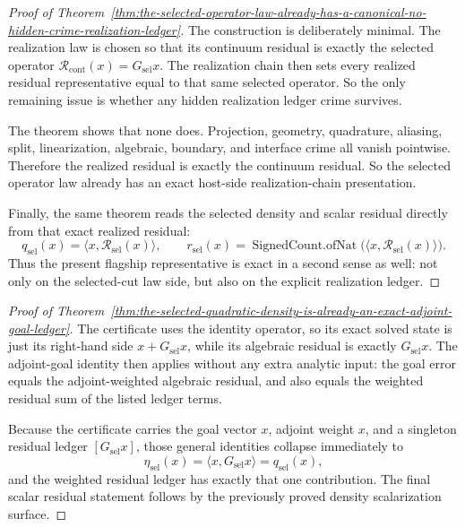 \begin{proof}[Proof of Theorem~\ref{thm:the-selected-operator-law-already-has-a-canonical-no-hidden-crime-realization-ledger}]
\label{proof:thm:the-selected-operator-law-already-has-a-canonical-no-hidden-crime-realization-ledger}
The construction is deliberately minimal. The realization law is chosen so
that its continuum residual is exactly the selected operator
\(\mathcal R_{\mathrm{cont}}(x)=G_{\mathrm{sel}}x\). The realization chain
then sets every realized residual representative equal to that same selected
operator. So the only remaining issue is whether any hidden realization ledger
crime survives.

The theorem shows that none does. Projection, geometry, quadrature, aliasing,
split, linearization, algebraic, boundary, and interface crime all vanish
pointwise. Therefore the realized residual is exactly the continuum residual.
So the selected operator law already has an exact host-side
realization-chain presentation.

Finally, the same theorem reads the selected density and scalar residual
directly from that exact realized residual:
\[
q_{\mathrm{sel}}(x)=\langle x,\mathcal R_{\mathrm{sel}}(x)\rangle,
\qquad
r_{\mathrm{sel}}(x)=\operatorname{SignedCount.ofNat}\!\bigl(\langle x,\mathcal R_{\mathrm{sel}}(x)\rangle\bigr).
\]
Thus the present flagship representative is exact in a second sense as well:
not only on the selected-cut law side, but also on the explicit realization
ledger.
\end{proof}

\begin{proof}[Proof of Theorem~\ref{thm:the-selected-quadratic-density-is-already-an-exact-adjoint-goal-ledger}]
\label{proof:thm:the-selected-quadratic-density-is-already-an-exact-adjoint-goal-ledger}
The certificate uses the identity operator, so its exact solved state is just
its right-hand side \(x+G_{\mathrm{sel}}x\), while its algebraic residual is
exactly \(G_{\mathrm{sel}}x\). The adjoint-goal identity then applies without
any extra analytic input: the goal error equals the adjoint-weighted algebraic
residual, and also equals the weighted residual sum of the listed ledger
terms.

Because the certificate carries the goal vector \(x\), adjoint weight \(x\),
and a singleton residual ledger \([G_{\mathrm{sel}}x]\), those general
identities collapse immediately to
\[
\eta_{\mathrm{sel}}(x)
  =\langle x,G_{\mathrm{sel}}x\rangle
  =q_{\mathrm{sel}}(x),
\]
and the weighted residual ledger has exactly that one contribution.
The final scalar residual statement follows by the previously proved density
scalarization surface.
\end{proof}

